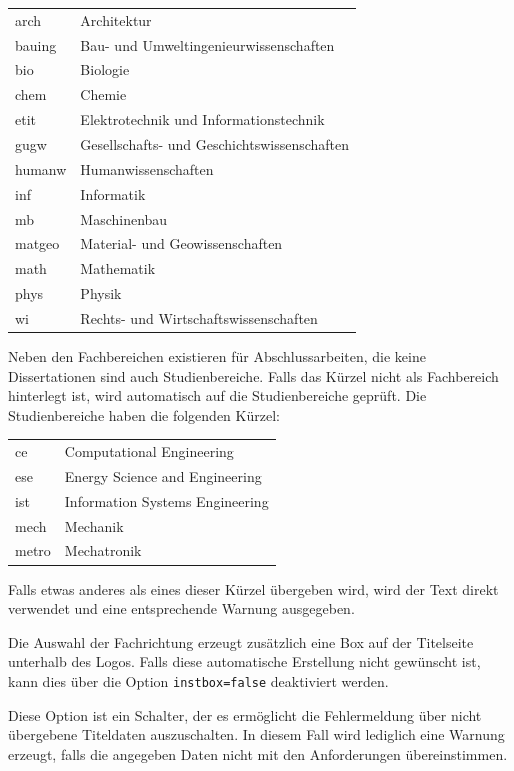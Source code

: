 \documentclass[
	ngerman,
	ruledheaders=section,%
	class=report,%
	thesis={type=bachelor},%
	accentcolor=9c,%
	custommargins=true,%
	marginpar=false,%
	parskip=half-,%
	fontsize=11pt,%
]{tudapub}
\let\code\texttt
\begin{document}
\begin{description}
	\begin{tabular}{@{}l@{${}\to{}$}l@{}}
		arch  & Architektur\\
		bauing& Bau- und Umweltingenieurwissenschaften\\
		bio   &Biologie\\
		chem  &Chemie\\
		etit  &Elektrotechnik und Informationstechnik\\
		gugw  &Gesellschafts- und Geschichtswissenschaften\\
		humanw&Humanwissenschaften\\
		inf   &Informatik\\
		mb    &Maschinenbau\\
		matgeo&Material- und Geowissenschaften\\
		math  &Mathematik\\
		phys  &Physik\\
		wi    &Rechts- und Wirtschaftswissenschaften
	\end{tabular}

	Neben den Fachbereichen existieren für Abschlussarbeiten, die keine Dissertationen sind auch Studienbereiche.
	Falls das Kürzel nicht als Fachbereich hinterlegt ist, wird automatisch auf die Studienbereiche geprüft. Die Studienbereiche haben die folgenden Kürzel:

	\begin{tabular}{@{}l@{${}\to{}$}l@{}}
		ce&Computational Engineering\\
		ese&Energy Science and Engineering\\
		ist&Information Systems Engineering\\
		mech&Mechanik\\
		metro&Mechatronik
	\end{tabular}

	Falls etwas anderes als eines dieser Kürzel übergeben wird, wird der Text direkt verwendet und eine entsprechende Warnung ausgegeben.

	Die Auswahl der Fachrichtung erzeugt zusätzlich eine Box auf der Titelseite unterhalb des Logos. Falls diese automatische Erstellung nicht gewünscht ist, kann dies über die Option \code{instbox=false} deaktiviert werden.
\item[ignore-missing-data] Diese Option ist ein Schalter, der es ermöglicht die Fehlermeldung über nicht übergebene Titeldaten auszuschalten. In diesem Fall wird lediglich eine Warnung erzeugt, falls die angegeben Daten nicht mit den Anforderungen übereinstimmen.
\end{description}
\end{document}
